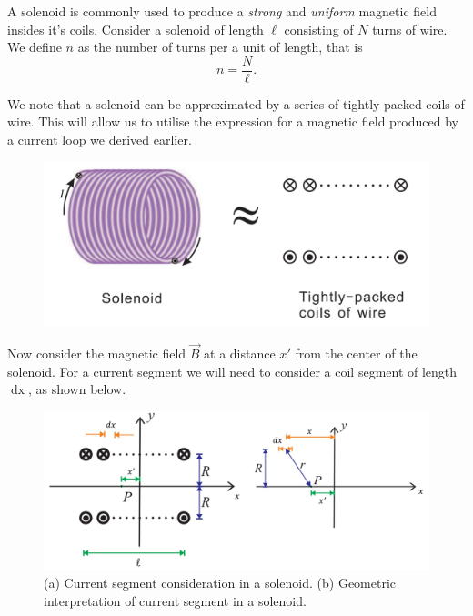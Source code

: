 A solenoid is commonly used to produce a \textit{strong} and \textit{uniform} magnetic field insides it's coils. Consider a solenoid of length $\ell$ consisting of $N$ turns of wire. We define $n$ as the number of turns per a unit of length, that is
\begin{equation}
    n = \frac{N}{\ell}.
\end{equation}

We note that a solenoid can be approximated by a series of tightly-packed coils of wire. This will allow us to utilise the expression for a magnetic field produced by a current loop we derived earlier.

\begin{figure}[h!]
    \centering
    \includegraphics[scale=0.4]{notes/images/Solenoid-1.JPG}
\end{figure}

Now consider the magnetic field $\vec{B}$ at a distance $x'$ from the center of the solenoid. For a current segment we will need to consider a coil segment of length $\mathop{\mathrm{d}x}$, as shown below.

\begin{figure}[h!]
    \centering
    \includegraphics[scale=0.4]{notes/images/Solenoid-2.JPG}
    \caption{(a) Current segment consideration in a solenoid. (b) Geometric interpretation of current segment in a solenoid.}
\end{figure}
\FloatBarrier

